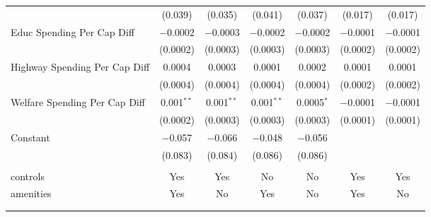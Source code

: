 \begin{table}[!htbp]
\begin{tabular}{@{\extracolsep{5pt}}lcccccc}
  & (0.039) & (0.035) & (0.041) & (0.037) & (0.017) & (0.017) \\ 
  Educ Spending Per Cap Diff & $-$0.0002 & $-$0.0003 & $-$0.0002 & $-$0.0002 & $-$0.0001 & $-$0.0001 \\ 
  & (0.0002) & (0.0003) & (0.0003) & (0.0003) & (0.0002) & (0.0002) \\ 
  Highway Spending Per Cap Diff & 0.0004 & 0.0003 & 0.0001 & 0.0002 & 0.0001 & 0.0001 \\ 
  & (0.0004) & (0.0004) & (0.0004) & (0.0004) & (0.0002) & (0.0002) \\ 
  Welfare Spending Per Cap Diff & 0.001$^{**}$ & 0.001$^{**}$ & 0.001$^{**}$ & 0.0005$^{*}$ & $-$0.0001 & $-$0.0001 \\ 
  & (0.0002) & (0.0003) & (0.0003) & (0.0003) & (0.0001) & (0.0001) \\ 
  Constant & $-$0.057 & $-$0.066 & $-$0.048 & $-$0.056 &  &  \\ 
  & (0.083) & (0.084) & (0.086) & (0.086) &  &  \\ 
 \hline \\[-1.8ex] 
controls & Yes & Yes & No & No & Yes & Yes \\ 
amenities & Yes & No & Yes & No & Yes & No \\ 
\hline \\[-1.8ex] 
\hline 
\hline \\[-1.8ex] 
\end{tabular} 
\end{table} 
